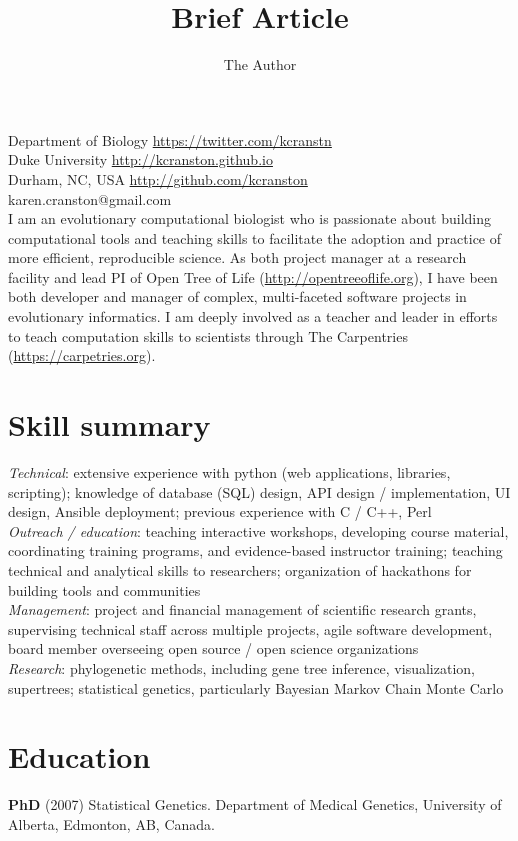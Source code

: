 \documentclass[10pt]{article}
\title{Brief Article}
\author{The Author}
\begin{document}
\noindent Department of Biology \hfill \url{https://twitter.com/kcranstn} \\
Duke University  \hfill \url{http://kcranston.github.io} \\
Durham, NC, USA \hfill  \url{http://github.com/kcranston} \\
karen.cranston@gmail.com  \\

\vspace{0.4cm}
I am an evolutionary computational biologist who is passionate about building computational tools and teaching skills to facilitate the adoption and practice of more efficient, reproducible science. As both project manager at a research facility and lead PI of Open Tree of Life (\url{http://opentreeoflife.org}), I have been both developer and manager of complex, multi-faceted software projects in evolutionary informatics. I am deeply involved as a teacher and leader in efforts to teach computation skills to scientists through The Carpentries (\url{https://carpetries.org}). 

\section*{Skill summary}

\emph{Technical}: extensive experience with python (web applications, libraries, scripting); knowledge of database (SQL) design, API design / implementation, UI design, Ansible deployment; previous experience with C / C++, Perl \\

\emph{Outreach / education}: teaching interactive workshops, developing course material, coordinating training programs, and evidence-based instructor training; teaching technical and analytical skills to researchers; organization of hackathons for building tools and communities \\ 

\emph{Management}: project and financial management of scientific research grants, supervising technical staff across multiple projects, agile software development, board member overseeing open source / open science organizations   \\

\emph{Research}: phylogenetic methods, including gene tree inference, visualization, supertrees; statistical genetics, particularly Bayesian Markov Chain Monte Carlo \\

\section*{Education}
{\bf PhD} (2007) Statistical Genetics. Department of Medical Genetics, University of Alberta, Edmonton, AB, Canada. 
\end{document}
